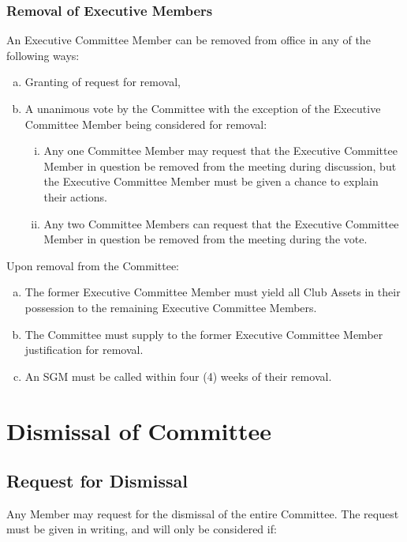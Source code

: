 \documentclass[a4paper,12pt]{article}
\begin{document}
\subsubsection{Removal of Executive Members}

An Executive Committee Member can be removed from office in any of the following ways:

\begin{enumerate}[a)]
	\item Granting of request for removal,
	\item A unanimous vote by the Committee with the exception of the Executive Committee Member being considered for removal:
	\begin{enumerate}[i)]
		\item Any one Committee Member may request that the Executive Committee Member in question be removed from the meeting during discussion, but the Executive Committee Member must be given a chance to explain their actions.
		\item Any two Committee Members can request that the Executive Committee Member in question be removed from the meeting during the vote.
	\end{enumerate}
\end{enumerate}

Upon removal from the Committee:

\begin{enumerate}[a)]
	\item The former Executive Committee Member must yield all Club Assets in their possession to the remaining Executive Committee Members.
	\item The Committee must supply to the former Executive Committee Member justification for removal.
	\item An SGM must be called within four (4) weeks of their removal.
\end{enumerate}

\section{Dismissal of Committee}

\subsection{Request for Dismissal}

Any Member may request for the dismissal of the entire Committee. The request must be given in writing, and will only be considered if:
\end{document}
